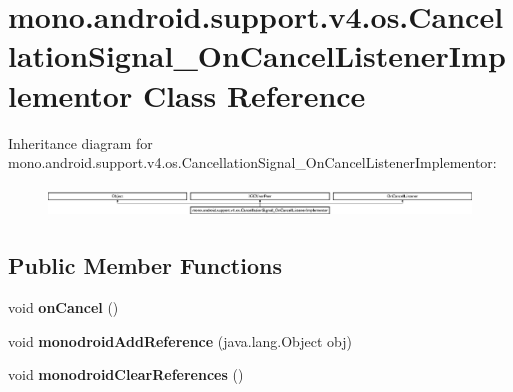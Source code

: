 \hypertarget{classmono_1_1android_1_1support_1_1v4_1_1os_1_1_cancellation_signal___on_cancel_listener_implementor}{}\section{mono.\+android.\+support.\+v4.\+os.\+Cancellation\+Signal\+\_\+\+On\+Cancel\+Listener\+Implementor Class Reference}
\label{classmono_1_1android_1_1support_1_1v4_1_1os_1_1_cancellation_signal___on_cancel_listener_implementor}
Inheritance diagram for mono.\+android.\+support.\+v4.\+os.\+Cancellation\+Signal\+\_\+\+On\+Cancel\+Listener\+Implementor\+:\begin{figure}[H]
\begin{center}
\leavevmode
\includegraphics[height=0.806336cm]{classmono_1_1android_1_1support_1_1v4_1_1os_1_1_cancellation_signal___on_cancel_listener_implementor}
\end{center}
\end{figure}
\subsection*{Public Member Functions}
\begin{DoxyCompactItemize}
\item 
\mbox{\label{classmono_1_1android_1_1support_1_1v4_1_1os_1_1_cancellation_signal___on_cancel_listener_implementor_a14a9b4bed965f010e2120c2eb10e68af}} 
void {\bfseries on\+Cancel} ()
\item 
\mbox{\label{classmono_1_1android_1_1support_1_1v4_1_1os_1_1_cancellation_signal___on_cancel_listener_implementor_a1d777c1a6c121dac15f3b673e277fc82}} 
void {\bfseries monodroid\+Add\+Reference} (java.\+lang.\+Object obj)
\item 
\mbox{\label{classmono_1_1android_1_1support_1_1v4_1_1os_1_1_cancellation_signal___on_cancel_listener_implementor_a2f6d27789484ee49837d8ebf4dd88e5e}} 
void {\bfseries monodroid\+Clear\+References} ()
\end{DoxyCompactItemize}

